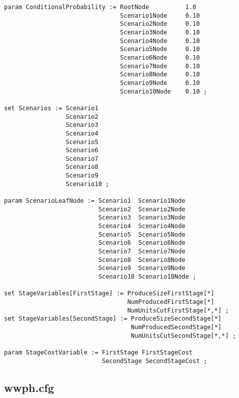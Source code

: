 {\begin{verbatim}
param ConditionalProbability := RootNode          1.0
                                Scenario1Node     0.10
                                Scenario2Node     0.10
                                Scenario3Node     0.10
                                Scenario4Node     0.10
                                Scenario5Node     0.10
                                Scenario6Node     0.10
                                Scenario7Node     0.10
                                Scenario8Node     0.10
                                Scenario9Node     0.10
                                Scenario10Node    0.10 ;

set Scenarios := Scenario1
                 Scenario2
                 Scenario3
                 Scenario4
                 Scenario5
                 Scenario6
                 Scenario7
                 Scenario8
                 Scenario9
                 Scenario10 ;

param ScenarioLeafNode := Scenario1  Scenario1Node
                          Scenario2  Scenario2Node
                          Scenario3  Scenario3Node
                          Scenario4  Scenario4Node
                          Scenario5  Scenario5Node
                          Scenario6  Scenario6Node
                          Scenario7  Scenario7Node
                          Scenario8  Scenario8Node
                          Scenario9  Scenario9Node
                          Scenario10 Scenario10Node ;

set StageVariables[FirstStage] := ProduceSizeFirstStage[*]
                                  NumProducedFirstStage[*]
                                  NumUnitsCutFirstStage[*,*] ;
set StageVariables[SecondStage] := ProduceSizeSecondStage[*]
                                   NumProducedSecondStage[*]
                                   NumUnitsCutSecondStage[*,*] ;

param StageCostVariable := FirstStage FirstStageCost
                           SecondStage SecondStageCost ;

\end{verbatim}
}

\subsection{wwph.cfg}

